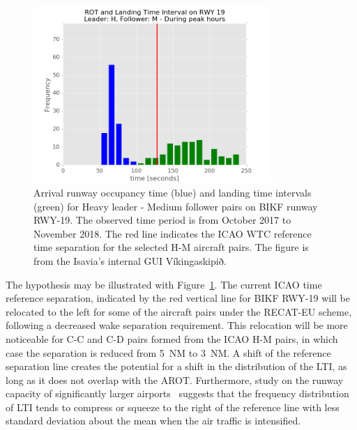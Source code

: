 \begin{figure}[h]
    \centering
    \includegraphics[width=0.8\textwidth]{graphics/fig_rot_landig_time_interval_RWY19_leader_H_follower_M_peak-hour_BAR_20171004_20181130.png}
    \caption[AROT and LTI of H-M pairs on RWY~19]{Arrival runway occupancy time (blue) and landing time intervals (green) for Heavy leader - Medium follower pairs on BIKF runway RWY-19. The observed time period is from October 2017 to November 2018. The red line indicates the ICAO WTC reference time separation for the selected H-M aircraft pairs. The figure is from the Isavia's internal GUI Víkingaskipið.}\label{fig:AROT_LTI_rwy19_H_M}
\end{figure}

The hypothesis may be illustrated with Figure~\ref{fig:AROT_LTI_rwy19_H_M}. The current ICAO time reference separation, indicated by the red vertical line for BIKF RWY-19 will be relocated to the left for some of the aircraft pairs under the RECAT-EU scheme, following a decreased wake separation requirement. This relocation will be more noticeable for C-C and C-D pairs formed from the ICAO H-M pairs, in which case the separation is reduced from 5~NM to 3~NM. A shift of the reference separation line creates the potential for a shift in the distribution of the LTI, as long as it does not overlap with the AROT. Furthermore, study on the runway capacity of significantly larger airports~\cite{kolos2013influence} suggests that the frequency distribution of LTI tends to compress or squeeze to the right of the reference line with less standard deviation about the mean when the air traffic is intensified.






